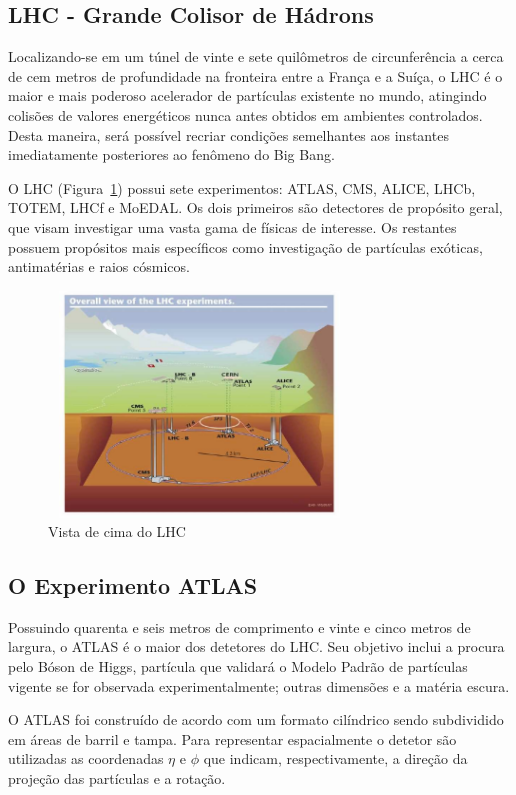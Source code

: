\documentclass[a4paper,10pt,titlepage]{article}
\begin{document}
\subsection{LHC - Grande Colisor de Hádrons}

Localizando-se em um túnel de vinte e sete quilômetros de circunferência a cerca de cem metros de profundidade na fronteira entre a França e a Suíça, o LHC é o maior e mais poderoso acelerador de partículas existente no mundo, atingindo colisões de valores energéticos nunca antes obtidos em ambientes controlados.
Desta maneira, será possível recriar condições semelhantes aos instantes imediatamente posteriores ao fenômeno do Big Bang.

O LHC (Figura~\ref{fig:top_view_lhc}) possui sete experimentos: ATLAS, CMS, ALICE, LHCb, TOTEM, LHCf e MoEDAL.
Os dois primeiros são detectores de propósito geral, que visam investigar uma vasta gama de físicas de interesse. Os restantes possuem propósitos mais específicos como investigação de partículas exóticas, antimatérias e raios cósmicos.

\begin{figure}[htbp!]
 \centering
 \includegraphics[width=8cm,height=6cm]{Figs/atlas/top_view_lhc.pdf}
 \caption{Vista de cima do LHC}
 \label{fig:top_view_lhc}
\end{figure}

\subsection{O Experimento ATLAS}

Possuindo quarenta e seis metros de comprimento e vinte e cinco metros de largura, o ATLAS é o maior dos detetores do LHC. Seu objetivo inclui a procura pelo Bóson de Higgs, partícula que validará o Modelo Padrão de partículas vigente se for observada experimentalmente; outras dimensões e a matéria escura.

O ATLAS foi construído de acordo com um formato cilíndrico sendo subdividido em áreas de barril e tampa.
Para representar espacialmente o detetor são utilizadas as coordenadas $\eta$ e $\phi$ que indicam, respectivamente, a direção da projeção das partículas e a rotação.
\end{document}

